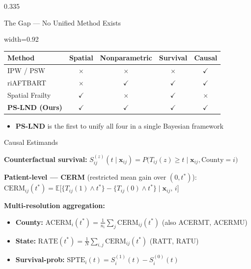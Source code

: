 \documentclass[final]{beamer}
\begin{document}
\begin{frame}[fragile]
\begin{columns}[T]
\begin{column}{0.335\textwidth}
\begin{posterblock}{The Gap --- No Unified Method Exists}
\centering
\begin{adjustbox}{width=0.92\textwidth}
\renewcommand{\arraystretch}{1.3}
\begin{tabular}{l c c c c}
\toprule
\textbf{Method} & \textbf{Spatial} & \textbf{Nonparametric} & \textbf{Survival} & \textbf{Causal} \\
\midrule
IPW / PSW & $\times$ & $\times$ & $\times$ & $\checkmark$ \\
riAFTBART & $\times$ & $\checkmark$ & $\checkmark$ & $\checkmark$ \\
Spatial Frailty & $\checkmark$ & $\times$ & $\checkmark$ & $\times$ \\
\rowcolor{vlgreen} \textbf{PS-LND (Ours)} & $\boldsymbol{\checkmark}$ & $\boldsymbol{\checkmark}$ & $\boldsymbol{\checkmark}$ & $\boldsymbol{\checkmark}$ \\
\bottomrule
\end{tabular}
\end{adjustbox}
\raggedright
\vspace{3pt}
\begin{itemize}
\item \textbf{PS-LND} is the first to unify all four in a single Bayesian framework
\end{itemize}
\end{posterblock}

\vspace{4pt}

\begin{posterblock}{Causal Estimands}

{\color{FSUgarnet}\textbf{Counterfactual survival:}} $S^{(z)}_{ij}(t\mid\mathbf{x}_{ij}) = P\bigl(T_{ij}(z)\geq t \mid \mathbf{x}_{ij}, \text{County}=i\bigr)$

\vspace{4pt}
\begin{keybox}
\centering
\textbf{Patient-level --- CERM} (restricted mean gain over $(0,t^*)$):\\[2pt]
$\text{CERM}_{ij}(t^*) = \mathbb{E}\bigl[\{T_{ij}(1)\wedge t^*\} - \{T_{ij}(0)\wedge t^*\} \mid \mathbf{x}_{ij},\, i\bigr]$
\end{keybox}

\vspace{4pt}
{\color{FSUgarnet}\textbf{Multi-resolution aggregation:}}
\begin{itemize}
\item \textbf{County:}\; $\text{ACERM}_i(t^*) = \frac{1}{n_i}\sum_{j}\text{CERM}_{ij}(t^*)$\; (also ACERMT, ACERMU)
\item \textbf{State:}\; $\text{RATE}(t^*) = \frac{1}{N}\sum_{i,j}\text{CERM}_{ij}(t^*)$\; (RATT, RATU)
\item \textbf{Survival-prob:}\; $\text{SPTE}_i(t) = S^{(1)}_i(t) - S^{(0)}_i(t)$
\end{itemize}


\end{posterblock}
\end{column}
\end{columns}
\end{frame}
\end{document}
